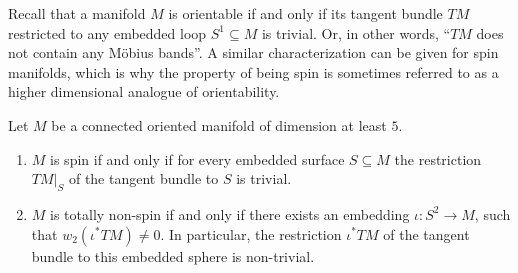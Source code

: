 Recall that a manifold $M$ is orientable if and only if its tangent bundle $TM$ restricted to any embedded loop $S^1 \subseteq M$ is trivial. Or, in other words, ``$TM$ does not contain any Möbius bands''. A similar characterization can be given for spin manifolds, which is why the property of being spin is sometimes referred to as a higher dimensional analogue of orientability.

\begin{proposition}
    \label{bundles:prop:spin_characterisation}
    Let $M$ be a connected oriented manifold of dimension at least $5$.
    \begin{enumerate}[label=(\roman*)]
        \item \label{bundles:eq:characterization_spin} $M$ is spin if and only if for every embedded surface $S \subseteq M$ the restriction $TM|_S$ of the tangent bundle to $S$ is trivial.
        \item \label{bundles:eq:characterization_totally_non_spin} $M$ is totally non-spin if and only if there exists an embedding $ \iota \colon S^2 \to M$, such that $w_2(\iota^\ast TM) \neq 0$. In particular, the restriction $\iota^\ast TM$ of the tangent bundle to this embedded sphere is non-trivial.
    \end{enumerate}
\end{proposition}

